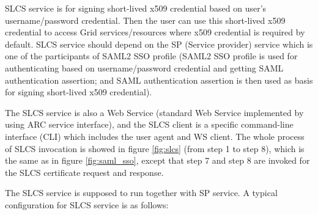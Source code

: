 \documentclass{article}                            %
\begin{document}
    SLCS service is for signing short-lived x509 credential based on user's username/password credential. Then the user can use this short-lived x509 credential to access Grid services/resources where x509 credential is required by default. SLCS service should depend on the SP (Service provider) service which is one of the participants of SAML2 SSO profile (SAML2 SSO profile is used for authenticating based on username/password credential and getting SAML authentication assertion; and SAML authentication assertion is then used as basis for signing short-lived x509 credential).

    The SLCS service is also a Web Service (standard Web Service implemented by using ARC service interface), and the SLCS client is a specific command-line interface (CLI) which includes the user agent and WS client. The whole process of SLCS invocation is showed in figure \ref{fig:slcs} (from step 1 to step 8), which is the same as in figure \ref{fig:saml_sso}, except that step 7 and step 8 are invoked for the SLCS certificate request and response.

\begin{figure}[ht]
\end{figure}

 The SLCS service is supposed to run together with SP service. A typical configuration for SLCS service is as follows:
\end{document}
